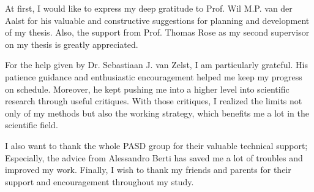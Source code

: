 At first, I would like to express my deep gratitude to Prof. Wil M.P. van der Aalst for his valuable and constructive suggestions for planning and development of my thesis. Also, the support from Prof. Thomas Rose as my second supervisor on my thesis is greatly appreciated.


For the help given by Dr. Sebastiaan J. van Zelst, I am particularly grateful. His patience guidance and enthusiastic encouragement helped me keep my progress on schedule. Moreover, he kept pushing me into a higher level into scientific research through useful critiques. With those critiques, I realized the limits not only of my methods but also the working strategy, which benefits me a lot in the scientific field.  

I also want to thank the whole PASD group for their valuable technical support; Especially, the advice from Alessandro Berti has saved me a lot of troubles and improved my work. 
Finally, I wish to thank my friends and parents for their support and encouragement throughout my study.